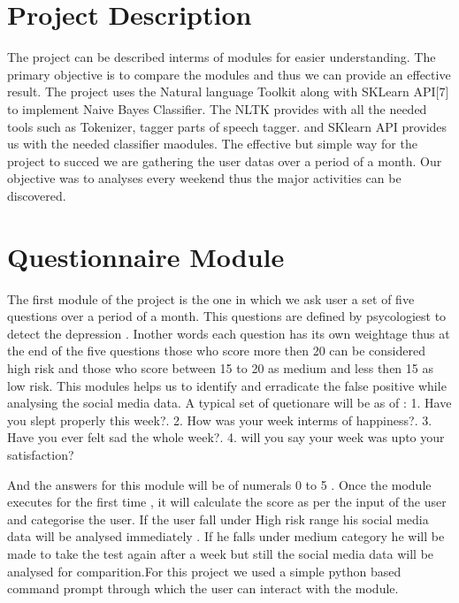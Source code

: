 \documentclass{chi2009}
\begin{document}
\begin{Abstract}
\section{Project Description}


The project can be described interms of modules for easier understanding. The primary objective is to compare the modules and thus we can provide an effective result. The project uses the Natural language Toolkit along with SKLearn API[7] to implement Naive Bayes Classifier. The NLTK provides with all the needed tools such as Tokenizer, tagger parts of speech tagger. and SKlearn API provides us with the needed classifier maodules. The effective but simple way for the project to succed we are gathering the user datas over a period of a month. Our objective was to analyses every weekend thus the major activities can be discovered. 




\section{Questionnaire Module}
The first module of the project is the one in which we ask user a set of five questions over a period of a month. This questions are defined by psycologiest to detect the depression . Inother words each question has its own weightage thus at the end of the five questions those who score more then 20 can be considered high risk and those who score between 15 to 20 as medium and less then 15 as low risk. This modules helps us to identify and erradicate the false positive while analysing the social media data. A typical set of quetionare will be as of : 
1. Have you slept properly this week?. 
2. How was your week interms of happiness?.
3. Have you ever felt sad the whole week?.
4. will you say your week was upto your satisfaction?


And the answers for this module will be of numerals 0 to 5 . Once the module executes for the first time , it will calculate the score as per the input of the user and categorise the user. If the user fall under High risk range his social media data will be analysed immediately . If he falls under medium category he will be made to take the test again after a week but still the social media data will be analysed for comparition.For this project we used a simple python based command prompt through which the user can interact with the module. 











\end{Abstract}
\end{document}
